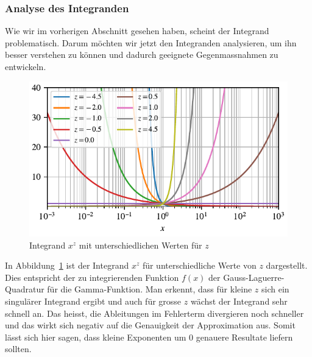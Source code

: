 \subsubsection{Analyse des Integranden}
Wie wir im vorherigen Abschnitt gesehen haben,
scheint der Integrand problematisch.
Darum möchten wir jetzt den Integranden analysieren,
um ihn besser verstehen zu können und
dadurch geeignete Gegenmassnahmen zu entwickeln.

\begin{figure}
\centering
% 
\includegraphics{papers/laguerre/images/integrand.pdf}
\caption{Integrand $x^z$ mit unterschiedlichen Werten für $z$}
\label{laguerre:fig:integrand}
\end{figure}

In Abbildung~\ref{laguerre:fig:integrand} ist der Integrand $x^z$ für
unterschiedliche Werte von $z$ dargestellt.
Dies entspricht der zu integrierenden Funktion $f(x)$
der Gauss-Laguerre-Quadratur für die Gamma-Funktion.
Man erkennt,
dass für kleine $z$ sich ein singulärer Integrand ergibt
und auch für grosse $z$ wächst der Integrand sehr schnell an.
Das heisst,
die Ableitungen im Fehlerterm divergieren noch schneller
und das wirkt sich negativ auf die Genauigkeit der Approximation aus.
Somit lässt sich hier sagen,
dass kleine Exponenten um $0$ genauere Resultate liefern sollten.

